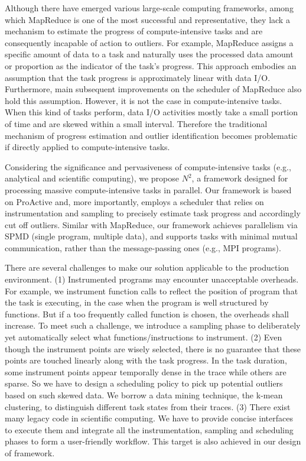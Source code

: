 Although there have emerged various large-scale computing frameworks, among which MapReduce is one of the most successful and representative, they lack a mechanism to estimate the progress of compute-intensive tasks and are consequently incapable of action to outliers. For example, MapReduce assigns a specific amount of data to a task and naturally uses the processed data amount or proportion as the indicator of the task's progress. This approach embodies an assumption that the task progress is approximately linear with data I/O. Furthermore, main subsequent improvements on the scheduler of MapReduce also hold this assumption. However, it is not the case in compute-intensive tasks. When this kind of tasks perform, data I/O activities mostly take a small portion of time and are skewed within a small interval. Therefore the traditional mechanism of progress estimation and outlier identification becomes problematic if directly applied to compute-intensive tasks.

Considering the significance and pervasiveness of compute-intensive tasks (e.g., analytical and scientific computing), we propose $N^2$, a framework designed for processing massive compute-intensive tasks in parallel. Our framework is based on ProActive and, more importantly, employs a scheduler that relies on instrumentation and sampling to precisely estimate task progress and accordingly cut off outliers. Similar with MapReduce, our framework achieves parallelism via SPMD (single program, multiple data), and supports tasks with minimal mutual communication, rather than the message-passing ones (e.g., MPI programs).

There are several challenges to make our solution applicable to the production environment. (1) Instrumented programs may encounter unacceptable overheads. For example, we instrument function calls to reflect the position of program that the task is executing, in the case when the program is well structured by functions. But if a too frequently called function is chosen, the overheads shall increase. To meet such a challenge, we introduce a sampling phase to deliberately yet automatically select what functions/instructions to instrument. (2) Even though the instrument points are wisely selected, there is no guarantee that these points are touched linearly along with the task progress. In the task duration, some instrument points appear temporally dense in the trace while others are sparse. So we have to design a scheduling policy to pick up potential outliers based on such skewed data. We borrow a data mining technique, the k-mean clustering, to distinguish different task states from their traces. (3) There exist many legacy code in scientific computing. We have to provide concise interfaces to execute them and integrate all the instrumentation, sampling and scheduling phases to form a user-friendly workflow. This target is also achieved in our design of framework.

